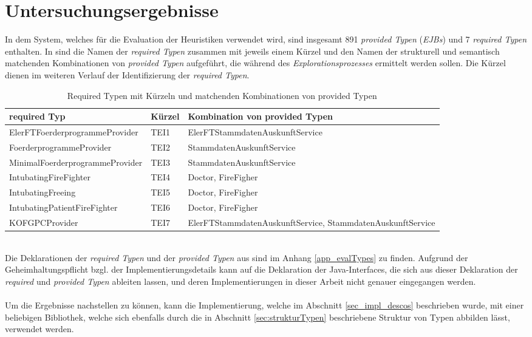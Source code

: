 \chapter{Untersuchungsergebnisse}\label{chap_evaluation}
In dem System, welches für die Evaluation der \Gls{Heuristik}en verwendet wird, sind insgesamt 891 \emph{provided Typen} (\emph{EJBs}) und 7 \emph{required Typen} enthalten. In  sind die Namen der \emph{required Typen} zusammen mit jeweils einem Kürzel und den Namen der strukturell und semantisch matchenden Kombinationen von \emph{provided Typen} aufgeführt, die während des \emph{Explorationsprozesses} ermittelt werden sollen. Die Kürzel dienen im weiteren Verlauf der Identifizierung der \emph{required Typen}.
\begin{table}[h!]
\centering
\small
\begin{tabular}{|p{6cm}|p{1.5cm}|p{6.5cm}|}
\hline
\hline
\centering\textbf{required Typ} & \textbf{Kürzel} & \textbf{Kombination von provided Typen}\\
\hline
\hline
ElerFTFoerderprogrammeProvider & TEI1 & ElerFTStammdatenAuskunftService\\
\hline
FoerderprogrammeProvider & TEI2 & StammdatenAuskunftService\\
\hline
MinimalFoerderprogrammeProvider & TEI3 & StammdatenAuskunftService\\
\hline
IntubatingFireFighter & TEI4 & Doctor, FireFigher\\
\hline
IntubatingFreeing & TEI5 & Doctor, FireFigher\\
\hline
IntubatingPatientFireFighter & TEI6 & Doctor, FireFigher\\
\hline
KOFGPCProvider & TEI7 & ElerFTStammdatenAuskunftService, StammdatenAuskunftService\\
\hline
\hline
\end{tabular}
\caption{Required Typen mit Kürzeln und matchenden Kombinationen von provided Typen}
 \label{tab:eIShort}
\end{table}
\noindent
\\
Die Deklarationen der \emph{required Typen} und der \emph{provided Typen} aus  sind im Anhang \ref{app_evalTypes} zu finden. Aufgrund der Geheimhaltungspflicht bzgl. der Implementierungsdetails kann auf die Deklaration der Java-Interfaces, die sich aus dieser Deklaration der \emph{required} und \emph{provided Typen} ableiten lassen, und deren Implementierungen in dieser Arbeit nicht genauer eingegangen werden.
\\\\
Um die Ergebnisse nachstellen zu können, kann die Implementierung, welche im Abschnitt \ref{sec_impl_descos} beschrieben wurde, mit einer beliebigen Bibliothek, welche sich ebenfalls durch die in Abschnitt \ref{sec:strukturTypen} beschriebene Struktur von Typen abbilden lässt, verwendet werden.

